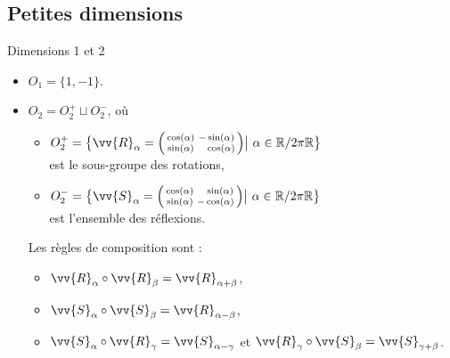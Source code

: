 \documentclass[bigger]{m53beamer}
\begin{document}
\subsection{Petites dimensions}
\begin{frame}{Dimensions 1 et 2}
  \begin{itemize}[<+(1)->]
    \item $O_{1} = \{1,-1\}$.
    \item $O_{2} = O_{2}^{+} \sqcup O_{2}^{-}$, où
      \begin{itemize}[<+(1)->]
        \item $O_{2}^{+}=\big\{ \vv{R}_{\alpha}=\begin{psmallmatrix}\cos(\alpha)&-\sin(\alpha)\\\sin(\alpha)&\phantom{-}\cos(\alpha)\end{psmallmatrix} \big|\ \alpha \in \mathbb{R}/2\pi\mathbb{R} \big\}$\\ est le sous-groupe des rotations,
        \item $O_{2}^{-}=\big\{ \vv{S}_{\alpha}=\begin{psmallmatrix}\cos(\alpha)&\phantom{-}\sin(\alpha)\\\sin(\alpha)&-\cos(\alpha)\end{psmallmatrix} \big|\ \alpha \in \mathbb{R}/2\pi\mathbb{R} \big\}$\\ est l'ensemble des réflexions.\pause\\
      \end{itemize}\pause
      Les règles de composition sont :
      \begin{itemize}[<+(1)->]
        \item $\vv{R}_{\alpha}\circ \vv{R}_{\beta} = \vv{R}_{\alpha+\beta}$,
        \item $\vv{S}_{\alpha}\circ \vv{S}_{\beta} = \vv{R}_{\alpha-\beta}$,
        \item $\vv{S}_{\alpha}\circ \vv{R}_{\gamma} = \vv{S}_{\alpha-\gamma}$ et $\vv{R}_{\gamma}\circ \vv{S}_{\beta} = \vv{S}_{\gamma+\beta}$.
      \end{itemize}\pause
  \end{itemize}
\end{frame}
\end{document}
